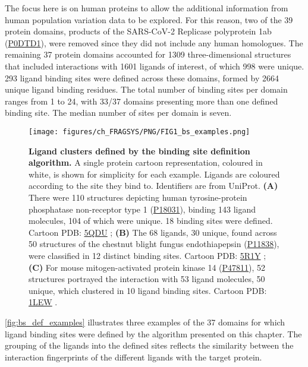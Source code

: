 The focus here is on human proteins to allow the additional information from human population variation data to be explored. For this reason, two of the 39 protein domains, products of the SARS-CoV-2 Replicase polyprotein 1ab (\href{https://www.uniprot.org/uniprotkb/P0DTD1/entry}{P0DTD1}), were removed since they did not include any human homologues. The remaining 37 protein domains accounted for 1309 three-dimensional structures that included interactions with 1601 ligands of interest, of which 998 were unique. 293 ligand binding sites were defined across these domains, formed by 2664 unique ligand binding residues. The total number of binding sites per domain ranges from 1 to 24, with 33/37 domains presenting more than one defined binding site. The median number of sites per domain is seven.

\begin{figure}[htb!]
    \centering
    \texttt{[image: figures/ch\_FRAGSYS/PNG/FIG1\_bs\_examples.png]}
    \caption[Ligand clusters defined by the binding site definition algorithm]{\textbf{Ligand clusters defined by the binding site definition algorithm.} A single protein cartoon representation, coloured in white, is shown for simplicity for each example. Ligands are coloured according to the site they bind to. Identifiers are from UniProt. \textbf{(A)} There were 110 structures depicting human tyrosine-protein phosphatase non-receptor type 1 (\href{https://www.uniprot.org/uniprotkb/P18031/entry}{P18031}), binding 143 ligand molecules, 104 of which were unique. 18 binding sites were defined. Cartoon PDB: \href{https://www.ebi.ac.uk/pdbe/entry/pdb/5qdu}{5QDU} \cite{KEEDY_2018_PTP1B}; \textbf{(B)} The 68 ligands, 30 unique, found across 50 structures of the chestnut blight fungus endothiapepsin (\href{https://www.uniprot.org/uniprotkb/P11838/entry}{P11838}), were classified in 12 distinct binding sites. Cartoon PDB: \href{https://www.ebi.ac.uk/pdbe/entry/pdb/5r1y}{5R1Y} \cite{WOLLENHAUPT_2020_F2X}; \textbf{(C)} For mouse mitogen-activated protein kinase 14 (\href{https://www.uniprot.org/uniprotkb/P47811/entry}{P47811}), 52 structures portrayed the interaction with 53 ligand molecules, 50 unique, which clustered in 10 ligand binding sites. Cartoon PDB: \href{https://www.ebi.ac.uk/pdbe/entry/pdb/1lew}{1LEW} \cite{CHANG_2002_MapKinase}.}
    \label{fig:bs_def_examples}
\end{figure}

\autoref{fig:bs_def_examples} illustrates three examples of the 37 domains for which ligand binding sites were defined by the algorithm presented on this chapter. The grouping of the ligands into the defined sites reflects the similarity between the interaction fingerprints of the different ligands with the target protein.

